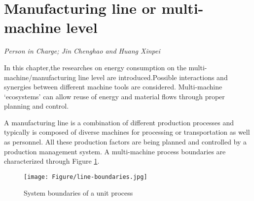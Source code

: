 \newpage
\section{Manufacturing line or multi-machine level}
\label{chapter3}

\textit{Person in Charge; Jin Chenghao and Huang Xinpei}


In this chapter,the researches on energy consumption on the multi-machine/manufacturing line level are introduced.Possible interactions and synergies between different machine tools are considered. Multi-machine ‘ecosystems’ can allow reuse of energy and material flows through proper planning and control.


A manufacturing line is a combination of different production processes and typically is composed of diverse machines for processing or transportation as well as personnel. All these production factors are being planned and controlled by a production management system. A multi-machine process boundaries are characterized through Figure \ref{fig:line-boundaries}. 

\begin{figure}[h!]
	\centering
	\texttt{[image: Figure/line-boundaries.jpg]}
	\caption{System boundaries of a unit process }
	\label{fig:line-boundaries}
\end{figure}

